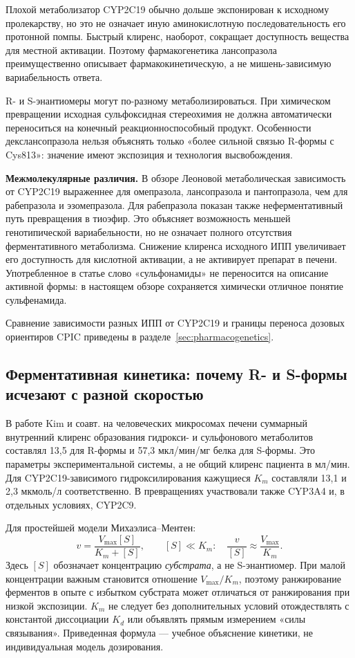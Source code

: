 \documentclass[11pt,a4paper,notitlepage]{report}
\newcommand{\src}[1]{\unskip\space\cite{#1}}
\begin{document}
Плохой метаболизатор CYP2C19 обычно дольше экспонирован к исходному пролекарству, но это не означает иную аминокислотную последовательность его протонной помпы. Быстрый клиренс, наоборот, сокращает доступность вещества для местной активации. Поэтому фармакогенетика лансопразола преимущественно описывает фармакокинетическую, а не мишень-зависимую вариабельность ответа.\src{cpic,molp450}

R- и S-энантиомеры могут по-разному метаболизироваться. При химическом превращении исходная сульфоксидная стереохимия не должна автоматически переноситься на конечный реакционноспособный продукт. Особенности декслансопразола нельзя объяснять только «более сильной связью R-формы с Cys813»: значение имеют экспозиция и технология высвобождения.\src{molchem,dexlabel}

\textbf{Межмолекулярные различия.} В обзоре Леоновой метаболическая зависимость от CYP2C19 выраженнее для омепразола, лансопразола и пантопразола, чем для рабепразола и эзомепразола. Для рабепразола показан также неферментативный путь превращения в тиоэфир. Это объясняет возможность меньшей генотипической вариабельности, но не означает полного отсутствия ферментативного метаболизма. Снижение клиренса исходного ИПП увеличивает его доступность для кислотной активации, а не активирует препарат в печени. Употребленное в статье слово «сульфонамиды» не переносится на описание активной формы: в настоящем обзоре сохраняется химически отличное понятие сульфенамида.\src{leonova2015,molp450,molchem}

Сравнение зависимости разных ИПП от CYP2C19 и границы переноса дозовых ориентиров CPIC приведены в разделе~\ref{sec:pharmacogenetics}.

\subsection{Ферментативная кинетика: почему R- и S-формы исчезают с разной скоростью}
В работе Kim и соавт. на человеческих микросомах печени суммарный внутренний клиренс образования гидрокси- и сульфонового метаболитов составлял 13,5 для R-формы и 57,3 мкл/мин/мг белка для S-формы. Это параметры экспериментальной системы, а не общий клиренс пациента в мл/мин. Для CYP2C19-зависимого гидроксилирования кажущиеся $K_m$ составляли 13,1 и 2,3 мкмоль/л соответственно. В превращениях участвовали также CYP3A4 и, в отдельных условиях, CYP2C9.\src{molstereokin}

Для простейшей модели Михаэлиса--Ментен:
\[
v=\frac{V_{\max}[S]}{K_m+[S]},
\qquad [S]\ll K_m:\quad
\frac{v}{[S]}\approx\frac{V_{\max}}{K_m}.
\]
Здесь $[S]$ обозначает концентрацию \emph{субстрата}, а не S-энантиомер. При малой концентрации важным становится отношение $V_{\max}/K_m$, поэтому ранжирование ферментов в опыте с избытком субстрата может отличаться от ранжирования при низкой экспозиции. $K_m$ не следует без дополнительных условий отождествлять с константой диссоциации $K_d$ или объявлять прямым измерением «силы связывания». Приведенная формула --- учебное объяснение кинетики, не индивидуальная модель дозирования.\src{molstereokin}
\end{document}
